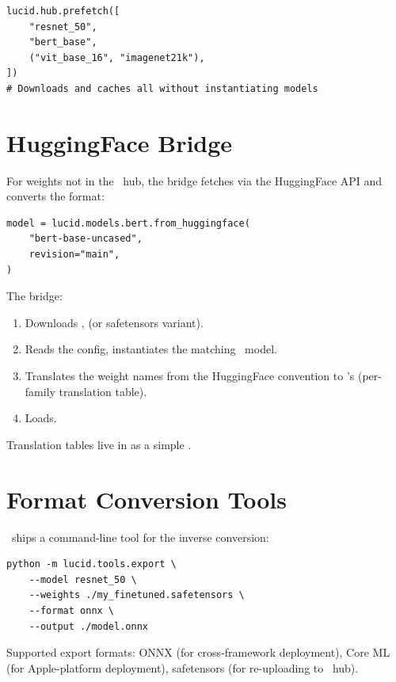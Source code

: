 \begin{lstlisting}[style=lucid,language=LucidPython]
lucid.hub.prefetch([
    "resnet_50",
    "bert_base",
    ("vit_base_16", "imagenet21k"),
])
# Downloads and caches all without instantiating models
\end{lstlisting}

\section{HuggingFace Bridge}
\label{sec:pretrained:hf_bridge}

For weights not in the \Lucid\ hub, the
 bridge fetches via the HuggingFace API
and converts the format:

\begin{lstlisting}[style=lucid,language=LucidPython]
model = lucid.models.bert.from_huggingface(
    "bert-base-uncased",
    revision="main",
)
\end{lstlisting}

The bridge:
\begin{enumerate}
  \item Downloads , 
    (or safetensors variant).
  \item Reads the config, instantiates the matching \Lucid\
    model.
  \item Translates the weight names from the HuggingFace
    convention to \Lucid's (per-family translation table).
  \item Loads.
\end{enumerate}

Translation tables live in
 as a simple
.

\section{Format Conversion Tools}
\label{sec:pretrained:conversion}

\Lucid\ ships a command-line tool for the inverse conversion:

\begin{lstlisting}[style=lucid,language=LucidPython]
python -m lucid.tools.export \
    --model resnet_50 \
    --weights ./my_finetuned.safetensors \
    --format onnx \
    --output ./model.onnx
\end{lstlisting}

Supported export formats: ONNX \cite{onnx_2017} (for
cross-framework deployment), Core ML (for Apple-platform
deployment), safetensors (for re-uploading to \Lucid\ hub).

